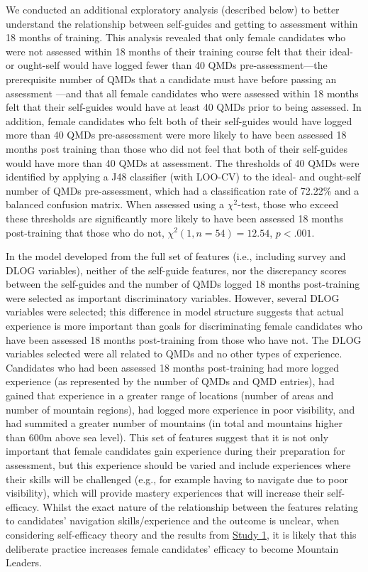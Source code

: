 \documentclass[
  12pt,
  a4paper,
]{book}
\begin{document}
We conducted an additional exploratory analysis (described below) to better understand the relationship between self-guides and getting to assessment within 18 months of training. This analysis revealed that only female candidates who were not assessed within 18 months of their training course felt that their ideal- or ought-self would have logged fewer than 40 QMDs pre-assessment---the prerequisite number of QMDs that a candidate must have before passing an assessment \citep{MountainTrainingUK2015a}---and that all female candidates who were assessed within 18 months felt that their self-guides would have at least 40 QMDs prior to being assessed. In addition, female candidates who felt both of their self-guides would have logged more than 40 QMDs pre-assessment were more likely to have been assessed 18 months post training than those who did not feel that both of their self-guides would have more than 40 QMDs at assessment. The thresholds of 40 QMDs were identified by applying a J48 classifier (with LOO-CV) to the ideal- and ought-self number of QMDs pre-assessment, which had a classification rate of 72.22\% and a balanced confusion matrix. When assessed using a \(\chi^2\)-test, those who exceed these thresholds are significantly more likely to have been assessed 18 months post-training that those who do not, \(\chi^2(1, n = 54) = 12.54\), \(p < .001\).

In the model developed from the full set of features (i.e., including survey and DLOG variables), neither of the self-guide features, nor the discrepancy scores between the self-guides and the number of QMDs logged 18 months post-training were selected as important discriminatory variables. However, several DLOG variables were selected; this difference in model structure suggests that actual experience is more important than goals for discriminating female candidates who have been assessed 18 months post-training from those who have not. The DLOG variables selected were all related to QMDs and no other types of experience. Candidates who had been assessed 18 months post-training had more logged experience (as represented by the number of QMDs and QMD entries), had gained that experience in a greater range of locations (number of areas and number of mountain regions), had logged more experience in poor visibility, and had summited a greater number of mountains (in total and mountains higher than 600m above sea level). This set of features suggest that it is not only important that female candidates gain experience during their preparation for assessment, but this experience should be varied and include experiences where their skills will be challenged (e.g., for example having to navigate due to poor visibility), which will provide mastery experiences that will increase their self-efficacy. Whilst the exact nature of the relationship between the features relating to candidates' navigation skills/experience and the outcome is unclear, when considering self-efficacy theory and the results from \protect\hyperlink{ml-qualitative}{Study 1}, it is likely that this deliberate practice increases female candidates' efficacy to become Mountain Leaders.
\end{document}
